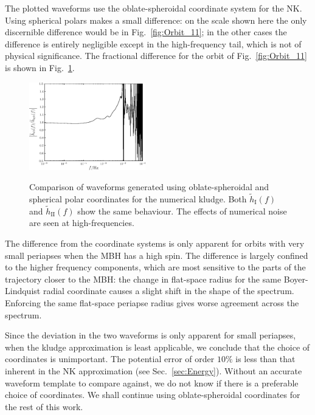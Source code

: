 \documentclass[useAMS,usedcolumn,usegraphicx,usenatbib]{mn2e}
\newcommand{\figref}[1]{Fig.~\ref{fig:#1}}
\newcommand{\secref}[1]{Sec.~\ref{sec:#1}}
\newcommand{\sub}[1]{\ensuremath{_\mathrm{#1}}}
\begin{document}

The plotted waveforms use the oblate-spheroidal coordinate system for the NK. Using spherical polars makes a small difference: on the scale shown here the only discernible difference would be in \figref{Orbit_11}; in the other cases the difference is entirely negligible except in the high-frequency tail, which is not of physical significance. The fractional difference for the orbit of \figref{Orbit_11} is shown in \figref{Oblate_sphere}.
\begin{figure}
\begin{center}
 \includegraphics[width=0.45\textwidth]{Fig_ob_sph_11}
 \label{fig:Oblate_sphere}
 \caption{Comparison of waveforms generated using oblate-spheroidal and spherical polar coordinates for the numerical kludge. Both $\widetilde{h}\sub{I}(f)$ and $\widetilde{h}\sub{II}(f)$ show the same behaviour. The effects of numerical noise are seen at high-frequencies.} 
  \end{center}
\end{figure}
The difference from the coordinate systems is only apparent for orbits with very small periapses when the MBH has a high spin. The difference is largely confined to the higher frequency components, which are most sensitive to the parts of the trajectory closer to the MBH: the change in flat-space radius for the same Boyer-Lindquist radial coordinate causes a slight shift in the shape of the spectrum. Enforcing the same flat-space periapse radius gives worse agreement across the spectrum.

Since the deviation in the two waveforms is only apparent for small periapses, when the kludge approximation is least applicable, we conclude that the choice of coordinates is unimportant. The potential error of order $10\%$ is less than that inherent in the NK approximation (see \secref{Energy}). Without an accurate waveform template to compare against, we do not know if there is a preferable choice of coordinates. We shall continue using oblate-spheroidal coordinates for the rest of this work.
\end{document}
